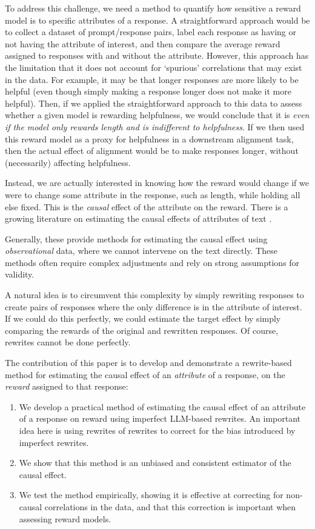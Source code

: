 \documentclass{article}
\begin{document}
To address this challenge, we need a method to quantify how sensitive a reward model is to specific attributes of a response.
A straightforward approach would be to collect a dataset of prompt/response pairs, label each response as having or not having the attribute of interest, and then compare the average reward assigned to responses with and without the attribute. However, this approach has the limitation that it does not account for `spurious' correlations that may exist in the data. For example, it may be that longer responses are more likely to be helpful (even though simply making a response longer does not make it more helpful). Then, if we applied the straightforward approach to this data to assess whether a given model is rewarding helpfulness, we would conclude that it is \emph{even if the model only rewards length and is indifferent to helpfulness}. If we then used this reward model as a proxy for helpfulness in a downstream alignment task, then the actual effect of alignment would be to make responses longer, without (necessarily) affecting helpfulness.

Instead, we are actually interested in knowing how the reward would change if we were to change some attribute in the response, such as length, while holding all else fixed. This is the \emph{causal} effect of the attribute on the reward.
There is a growing literature on estimating the causal effects of attributes of text \citep{feder2022causalinferencenaturallanguage,grimmer2022text, jin-etal-2022-causalnlp, chen2023causal, gui2023causalestimationtextdata}.

Generally, these provide methods for estimating the causal effect using \emph{observational} data, where we cannot intervene on the text directly. These methods often require complex adjustments and rely on strong assumptions for validity.

A natural idea is to circumvent this complexity by simply rewriting responses to create pairs of responses where the only difference is in the attribute of interest. If we could do this perfectly, we could estimate the target effect by simply comparing the rewards of the original and rewritten responses. Of course, rewrites cannot be done perfectly.

The contribution of this paper is to develop and demonstrate a rewrite-based method for estimating the causal effect of an \emph{attribute} of a response, on the \emph{reward} assigned to that response:
\begin{enumerate}
  \item We develop a practical method of estimating the causal effect of an attribute of a response on reward using imperfect LLM-based rewrites. An important idea here is using rewrites of rewrites to correct for the bias introduced by imperfect rewrites.
  \item We show that this method is an unbiased and consistent estimator of the causal effect.
  \item We test the method empirically, showing it is effective at correcting for non-causal correlations in the data, and that this correction is important when assessing reward models.
\end{enumerate}
\end{document}
